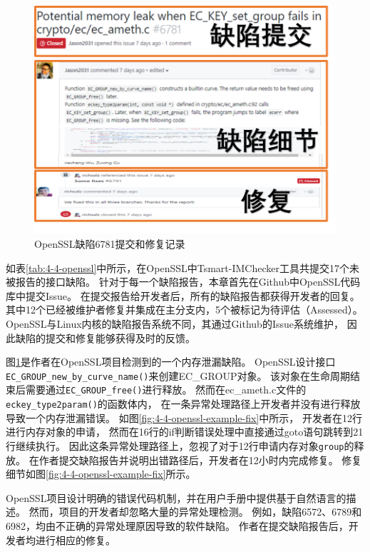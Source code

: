 \begin{figure}[t]
	\centering
	\includegraphics[width=0.8\linewidth]{figures/cp4-openssl-example.png}
	\caption{
		OpenSSL缺陷6781提交和修复记录
	}
	\label{fig:4-4-openssl-example}
\end{figure}



如表\ref{tab:4-4-openssl}中所示，在OpenSSL中Tsmart-IMChecker工具共提交17个未被报告的接口缺陷。
针对于每一个缺陷报告，本章首先在Github中OpenSSL代码库中提交Issue。
在提交报告给开发者后，所有的缺陷报告都获得开发者的回复。
其中12个已经被维护者修复并集成在主分支内，5个被标记为待评估（Assessed）。
OpenSSL与Linux内核的缺陷报告系统不同，其通过Github的Issue系统维护，
因此缺陷的提交和修复能够获得及时的反馈。



图\ref{fig:4-4-openssl-example}是作者在OpenSSL项目检测到的一个内存泄漏缺陷。
OpenSSL设计接口\texttt{EC\_GROUP\_new\_by\_curve\_name()}来创建EC\_GROUP对象。
该对象在生命周期结束后需要通过\texttt{EC\_GROUP\_free()}进行释放。
然而在ec\_ameth.c文件的\texttt{eckey\_type2param()}的函数体内，
在一条异常处理路径上开发者并没有进行释放导致一个内存泄漏错误。
如图\ref{fig:4-4-openssl-example-fix}中所示，
开发者在12行进行内存对象的申请，
然而在16行的if判断错误处理中直接通过goto语句跳转到21行继续执行。
因此这条异常处理路径上，忽视了对于12行申请内存对象\texttt{group}的释放。
在作者提交缺陷报告并说明出错路径后，开发者在12小时内完成修复。
修复细节如图\ref{fig:4-4-openssl-example-fix}所示。

OpenSSL项目设计明确的错误代码机制，并在用户手册中提供基于自然语言的描述。
然而，项目的开发者却忽略大量的异常处理检测。
例如，缺陷6572、6789和6982，均由不正确的异常处理原因导致的软件缺陷。
作者在提交缺陷报告后，开发者均进行相应的修复。




